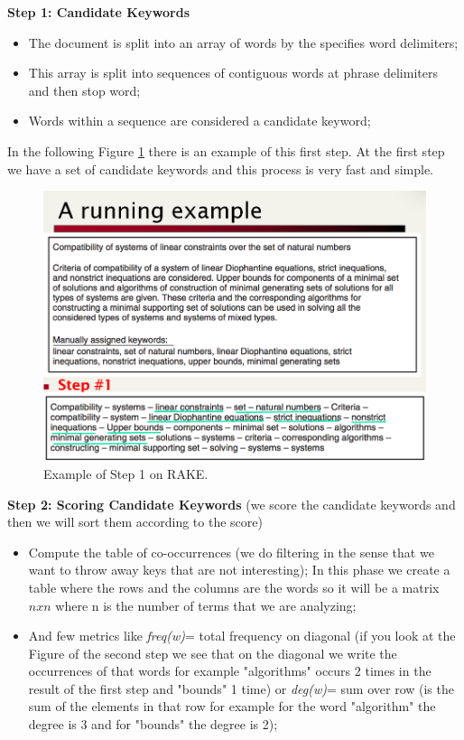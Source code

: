 \textbf{Step 1: Candidate Keywords}
\begin{itemize}
    \item The document is split into an array of words by the specifies word delimiters;
    \item This array is split into sequences of contiguous words at phrase delimiters and then stop word;
    \item Words within a sequence are considered a candidate keyword;
\end{itemize}
In the following Figure \ref{fig:rakestep1} there is an example of this first step. At the first step we have a set of candidate keywords and this process is very fast and simple.\newline
\begin{figure}
    \centering
    \includegraphics[width=\linewidth]{images/examplestep1.png}
    \caption{Example of Step 1 on RAKE.}
    \label{fig:rakestep1}
\end{figure}
\textbf{Step 2: Scoring Candidate Keywords} (we score the candidate keywords and then we will sort them according to the score)
\begin{itemize}
    \item Compute the table of co-occurrences (we do filtering in the sense that we want to throw away keys that are not interesting); In this phase we create a table where the rows and the columns are the words so it will be a matrix $nxn$ where n is the number of terms that we are analyzing;
    \item And few metrics like \textit{freq(w)}= total frequency on diagonal (if you look at the Figure of the second step we see that on the diagonal we write the occurrences of that words for example "algorithms" occurs 2 times in the result of the first step and "bounds" 1 time) or \textit{deg(w)}= sum over row (is the sum of the elements in that row for example for the word "algorithm" the degree is 3 and for "bounds" the degree is 2);
\end{itemize}
